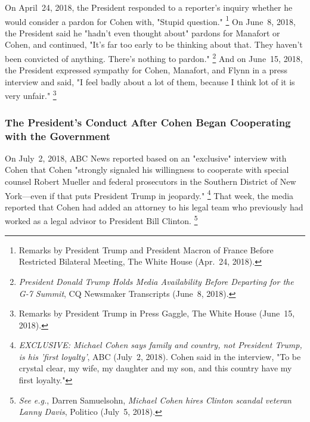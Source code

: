 On April~24, 2018, the President responded to a reporter's inquiry whether he would consider a pardon for Cohen with, "Stupid question."%
\footnote{Remarks by President Trump and President Macron of France Before Restricted Bilateral Meeting, The White House (Apr.~24, 2018).}
On June~8, 2018, the President said he "hadn't even thought about" pardons for Manafort or Cohen, and continued, "It's far too early to be thinking about that.
They haven't been convicted of anything.
There's nothing to pardon."%
\footnote{\textit{President Donald Trump Holds Media Availability Before Departing for the G-7 Summit}, CQ Newsmaker Transcripts (June~8, 2018).}
And on June~15, 2018, the President expressed sympathy for Cohen, Manafort, and Flynn in a press interview and said, "I feel badly about a lot of them, because I think lot of it is very unfair."%
\footnote{Remarks by President Trump in Press Gaggle, The White House (June~15, 2018).}

\subsubsection{The President's Conduct After Cohen Began Cooperating with the Government}

On July~2, 2018, ABC News reported based on an "exclusive" interview with Cohen that Cohen "strongly signaled his willingness to cooperate with special counsel Robert Mueller and federal prosecutors in the Southern District of New York---even if that puts President Trump in jeopardy."%
\footnote{\textit{EXCLUSIVE: Michael Cohen says family and country, not President Trump, is his 'first loyalty'}, ABC (July~2, 2018).
Cohen said in the interview, "To be crystal clear, my wife, my daughter and my son, and this country have my first loyalty."}
That week, the media reported that Cohen had added an attorney to his legal team who previously had worked as a legal advisor to President Bill Clinton.%
\footnote{\textit{See e.g.}, Darren Samuelsohn, \textit{Michael Cohen hires Clinton scandal veteran Lanny Davis}, Politico (July~5, 2018).}

